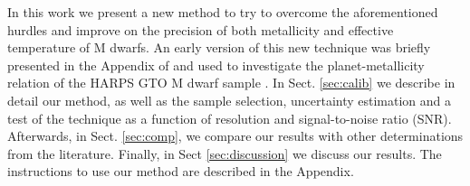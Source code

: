 \documentclass{aa}
\begin{document}
In this work we present a new method to try to overcome the aforementioned hurdles and improve on the precision of both metallicity and effective temperature of M dwarfs. An early version of this new technique was briefly presented in the Appendix of \citet{Neves-2013} and used to investigate the planet-metallicity relation of the HARPS GTO M dwarf sample \citep{Bonfils-2013}. In Sect. \ref{sec:calib} we describe in detail our method, as well as the sample selection, uncertainty estimation and a test of the technique as a function of resolution and signal-to-noise ratio (SNR). Afterwards, in Sect. \ref{sec:comp}, we compare our results with other determinations from the literature. Finally, in Sect \ref{sec:discussion} we discuss our results. The instructions to use our method are described in the Appendix. 




\end{document}

